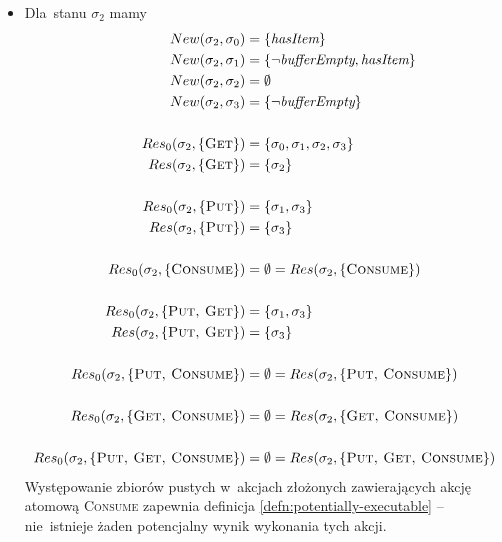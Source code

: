 \documentclass[11pt,a4paper]{article}
\begin{document}
\begin{itemize}
    \item Dla~stanu $\sigma_2$ mamy
    \begin{align*}
        New(\sigma_2, \sigma_0) &= \{ \textit{hasItem} \} \\
        New(\sigma_2, \sigma_1) &= \{ \neg \textit{bufferEmpty}, \textit{hasItem} \} \\
        New(\sigma_2, \sigma_2) &= \emptyset \\
        New(\sigma_2, \sigma_3) &= \{ \neg \textit{bufferEmpty} \} \\
        \\
        Res_0(\sigma_2, \{ \textsc{Get} \}) &= \{ \sigma_0, \sigma_1, \sigma_2, \sigma_3 \} \\
        Res(\sigma_2, \{ \textsc{Get} \}) &= \{ \sigma_2 \} \\
        \\
        Res_0(\sigma_2, \{ \textsc{Put} \}) &= \{ \sigma_1, \sigma_3 \} \\
        Res(\sigma_2, \{ \textsc{Put} \}) &= \{ \sigma_3 \} \\
        \\
        Res_0(\sigma_2, \{ \textsc{Consume} \}) &= \emptyset = Res(\sigma_2, \{ \textsc{Consume} \}) \\
        \\
        Res_0(\sigma_2, \{ \textsc{Put, Get} \}) &= \{ \sigma_1, \sigma_3 \} \\
        Res(\sigma_2, \{ \textsc{Put, Get} \}) &= \{ \sigma_3 \} \\
        \\
        Res_0(\sigma_2, \{ \textsc{Put, Consume} \}) &= \emptyset = Res(\sigma_2, \{ \textsc{Put, Consume} \}) \\
        \\
        Res_0(\sigma_2, \{ \textsc{Get, Consume} \}) &= \emptyset = Res(\sigma_2, \{ \textsc{Get, Consume} \}) \\
        \\
        Res_0(\sigma_2, \{ \textsc{Put, Get, Consume} \}) &= \emptyset = Res(\sigma_2, \{ \textsc{Put, Get, Consume} \})
    \end{align*}
    Występowanie zbiorów pustych w~akcjach złożonych zawierających akcję atomową \textsc{Consume} zapewnia definicja \ref{defn:potentially-executable} -- nie~istnieje żaden potencjalny wynik wykonania tych akcji.


\end{itemize}
\end{document}
